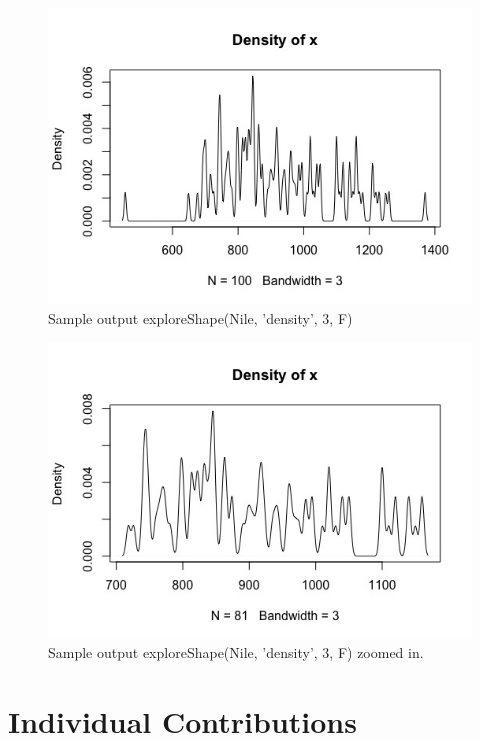\documentclass{article}
\begin{document}
\begin{figure}[H]
\centering
\includegraphics[scale=0.5]{Nile, 3 density before zoom.jpeg}
\caption{Sample output exploreShape(Nile, 'density', 3, F) }
\label{fig:Nile density graph 3}
\end{figure}


\begin{figure}[H]
\centering
\includegraphics[scale=0.5]{Nile, 3 density after zoom in.jpeg}
\caption{Sample output exploreShape(Nile, 'density', 3, F) zoomed in. }
\label{fig:Nile density graph 3, zoom in}
\end{figure}




\section{Individual Contributions}
\end{document}
